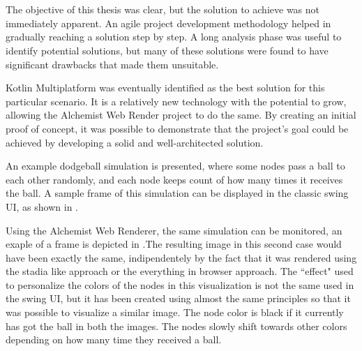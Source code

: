 \chapter{\conclusionsname}
\label{chap:conclusions}
The objective of this thesis was clear, but the solution to achieve was not immediately apparent. An agile project development methodology helped in gradually reaching a solution step by step. A long analysis phase was useful to identify potential solutions, but many of these solutions were found to have significant drawbacks that made them unsuitable.\newline


Kotlin Multiplatform was eventually identified as the best solution for this particular scenario. It is a relatively new technology with the potential to grow, allowing the Alchemist Web Render project to do the same. By creating an initial proof of concept, it was possible to demonstrate that the project's goal could be achieved by developing a solid and well-architected solution.\newline

An example dodgeball simulation is presented, where some nodes pass a ball to each other randomly, and each node keeps count of how many times it receives the ball. A sample frame of this simulation can be displayed in the classic swing UI, as shown in .\newline


Using the Alchemist Web Renderer, the same simulation can be monitored, an exaple of a frame is depicted in .The resulting image in this second case would have been exactly the same, indipendentely by the fact that it was rendered using the stadia like approach or the everything in browser approach. The ``effect" used to personalize the colors of the nodes in this visualization is not the same used in the swing UI, but it has been created using almost the same principles so that it was possible to visualize a similar image. The node color is black if it currently has got the ball in both the images. The nodes slowly shift towards other colors depending on how many time they received a ball.\newline

